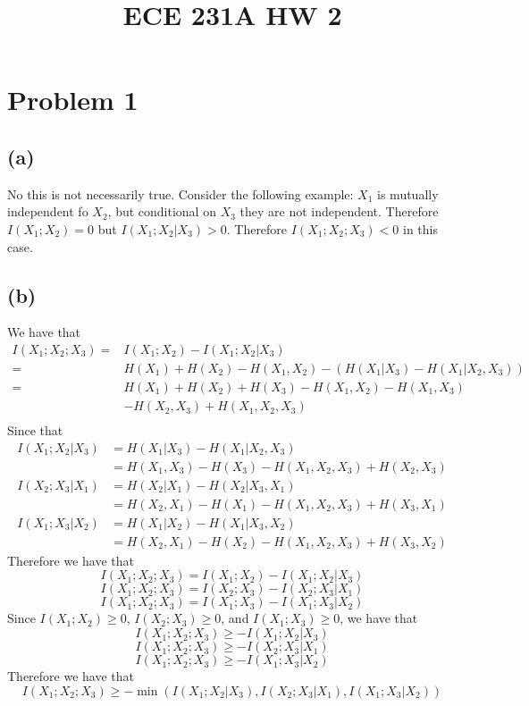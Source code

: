 
\title{ECE 231A HW 2}

\maketitle
\section*{Problem 1}
\subsection*{(a)}
No this is not necessarily true.  Consider the following example:
$X_1$ is mutually independent fo $X_2$, but conditional on $X_3$ they are
not independent.
Therefore $I(X_1;X_2)=0$ but $I(X_1;X_2|X_3)>0$. Therefore 
$I(X_1;X_2;X_3)<0$ in this case. 

\subsection*{(b)}
We have that
\begin{align*}
    I(X_1;X_2;X_3)=&I(X_1;X_2)-I(X_1;X_2|X_3)\\
    =&H(X_1)+H(X_2)-H(X_1,X_2)-\left(
        H(X_1|X_3)-H(X_1|X_2,X_3)
    \right)\\
    =&H(X_1)+H(X_2)+H(X_3)-H(X_1,X_2)-H(X_1,X_3)\\&-H(X_2,X_3)+H(X_1,X_2,X_3)\\
\end{align*}
Since that
\begin{align*}
    I(X_1;X_2|X_3)&=H(X_1|X_3)-H(X_1|X_2,X_3)\\
    &=H(X_1,X_3)-H(X_3)-H(X_1,X_2,X_3)+H(X_2,X_3)
\end{align*}
\begin{align*}
    I(X_2;X_3|X_1)&=H(X_2|X_1)-H(X_2|X_3,X_1)\\
    &=H(X_2,X_1)-H(X_1)-H(X_1,X_2,X_3)+H(X_3,X_1)
\end{align*}
\begin{align*}
    I(X_1;X_3|X_2)&=H(X_1|X_2)-H(X_1|X_3,X_2)\\
    &=H(X_2,X_1)-H(X_2)-H(X_1,X_2,X_3)+H(X_3,X_2)
\end{align*}
Therefore we have that
$$I(X_1;X_2;X_3)=I(X_1;X_2)-I(X_1;X_2|X_3)$$
$$I(X_1;X_2;X_3)=I(X_2;X_3)-I(X_2;X_3|X_1)$$
$$I(X_1;X_2;X_3)=I(X_1;X_3)-I(X_1;X_3|X_2)$$
Since $I(X_1;X_2)\geq0$, $I(X_2;X_3)\geq0$, and $I(X_1;X_3)\geq0$, we have that
$$I(X_1;X_2;X_3)\geq-I(X_1;X_2|X_3)$$
$$I(X_1;X_2;X_3)\geq-I(X_2;X_3|X_1)$$
$$I(X_1;X_2;X_3)\geq-I(X_1;X_3|X_2)$$
Therefore we have that
$$I(X_1;X_2;X_3)\geq-\min(I(X_1;X_2|X_3),I(X_2;X_3|X_1),I(X_1;X_3|X_2))$$
